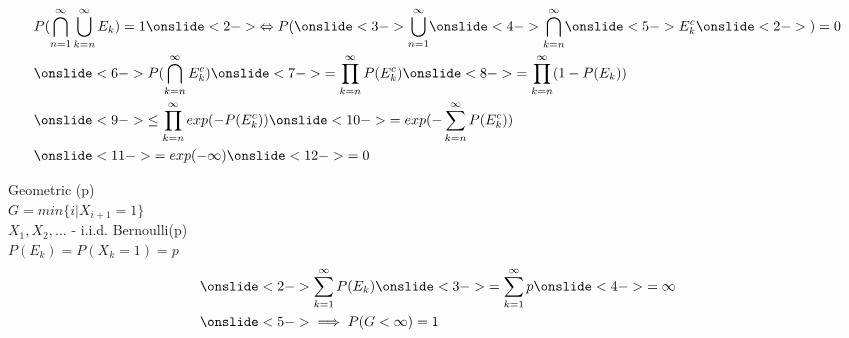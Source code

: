 \documentclass[20pt,xcolor={dvipsnames}]{beamer}
\begin{document}
\begin{frame}

\vspace{-1cm}

\hspace*{-0.8cm}\vbox{\begin{align*} 
& P(\bigcap_{n=1}^{\infty} \bigcup_{k=n}^{\infty} E_k)=1 
\onslide<2->{\Leftrightarrow P(}\onslide<3->{\bigcup_{n=1}^{\infty}} 
\onslide<4->{\bigcap_{k=n}^{\infty}} \onslide<5->{E_k^c} \onslide<2->{)=0}\\
& \onslide<6->{P(\bigcap_{k=n}^{\infty} E_k^c) } \onslide<7->{= \prod_{k=n}^{\infty} P(E_k^c) } 
\onslide<8->{= \prod_{k=n}^{\infty} (1-P(E_k)) } \\
& \onslide<9->{\leq \prod_{k=n}^{\infty} exp(-P(E_k^c))} \onslide<10->{= exp(-\sum_{k=n}^{\infty}P(E_k^c)) }\\
& \onslide<11->{=exp(-\infty)}\onslide<12->{=0}
\end{align*}}

\end{frame}

\begin{frame}[c]

\centering


\end{frame}

\begin{frame}[c]

\centering


\end{frame}

\begin{frame}[c]

\centering


\end{frame}

\begin{frame}[c]

\centering

Geometric (p) \\

$G = min \{i | X_{i+1} =1\} $ \\
$X_1, X_2, ... $ - i.i.d. Bernoulli(p) \\
$P(E_k) = P(X_k = 1) = p $ \\

\begin{align*}
& \onslide<2->{\sum_{k=1}^{\infty}P(E_k)}
\onslide<3->{=\sum_{k=1}^{\infty}p }
\onslide<4->{=\infty} \\
& \onslide<5->{\implies P(G<\infty)=1}
\end{align*}

\end{frame}
\end{document}
